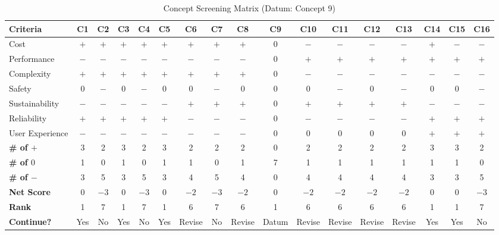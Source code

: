 \documentclass[12pt]{article}
\begin{document}
\begin{landscape}
\begin{table}[h!]
\centering
\caption{Concept Screening Matrix (Datum: Concept 9)}
\label{tab:concept_screening_2}
\begin{tabular}{l c c c c c c c c c c c c c c c c}
\toprule
\textbf{Criteria} & \textbf{C1} & \textbf{C2} & \textbf{C3} & \textbf{C4} & \textbf{C5} & \textbf{C6} & \textbf{C7} & \textbf{C8} & \textbf{C9} & \textbf{C10} & \textbf{C11} & \textbf{C12} & \textbf{C13} & \textbf{C14} & \textbf{C15} & \textbf{C16} \\
\midrule
Cost              & $+$ & $+$ & $+$ & $+$ & $+$ & $+$ & $+$ & $+$ & 0 & $-$ & $-$ & $-$ & $-$ & $+$ & $-$ & $-$ \\
Performance       & $-$ & $-$ & $-$ & $-$ & $-$ & $-$ & $-$ & $-$ & 0 & $+$ & $+$ & $+$ & $+$ & $+$ & $+$ & $+$ \\
Complexity        & $+$ & $+$ & $+$ & $+$ & $+$ & $+$ & $+$ & $+$ & 0 & $-$ & $-$ & $-$ & $-$ & $-$ & $-$ & $-$ \\
Safety            & 0 & $-$ & 0 & $-$ & 0 & 0 & $-$ & 0 & 0 & 0 & $-$ & 0 & $-$ & 0 & 0 & $-$ \\
Sustainability    & $-$ & $-$ & $-$ & $-$ & $-$ & $+$ & $+$ & $+$ & 0 & $+$ & $+$ & $+$ & $+$ & $-$ & $-$ & $-$ \\
Reliability       & $+$ & $+$ & $+$ & $+$ & $+$ & $-$ & $-$ & $-$ & 0 & $-$ & $-$ & $-$ & $-$ & $+$ & $+$ & $+$ \\
User Experience   & $-$ & $-$ & $-$ & $-$ & $-$ & $-$ & $-$ & $-$ & 0 & 0 & 0 & 0 & 0 & $+$ & $+$ & $+$ \\
\midrule
\textbf{\# of $+$} & 3 & 2 & 3 & 2 & 3 & 2 & 2 & 2 & 0 & 2 & 2 & 2 & 2 & 3 & 3 & 2 \\
\textbf{\# of $0$} & 1 & 0 & 1 & 0 & 1 & 1 & 0 & 1 & 7 & 1 & 1 & 1 & 1 & 1 & 1 & 0 \\
\textbf{\# of $-$} & 3 & 5 & 3 & 5 & 3 & 4 & 5 & 4 & 0 & 4 & 4 & 4 & 4 & 3 & 3 & 5 \\
\textbf{Net Score} & 0 & $-3$ & 0 & $-3$ & 0 & $-2$ & $-3$ & $-2$ & 0 & $-2$ & $-2$ & $-2$ & $-2$ & 0 & 0 & $-3$ \\
\textbf{Rank}      & 1 & 7 & 1 & 7 & 1 & 6 & 7 & 6 & 1 & 6 & 6 & 6 & 6 & 1 & 1 & 7 \\
\textbf{Continue?} & Yes & No & Yes & No & Yes & Revise & No & Revise & Datum & Revise & Revise & Revise & Revise & Yes & Yes & No \\
\bottomrule
\end{tabular}
\end{table}
\end{landscape}
\end{document}
